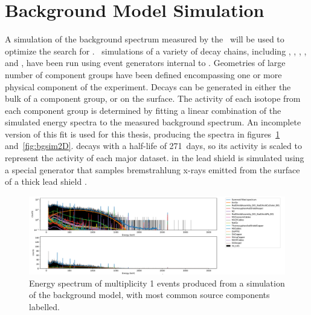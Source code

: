 \documentclass[/main.tex]{subfiles}
\begin{document}
\section{Background Model Simulation}
A simulation of the background spectrum measured by the \MJD\ will be used to optimize the search for \bbes.
\Mage\ simulations of a variety of decay chains, including , , , ,  and , have been run using event generators internal to \geant.
Geometries of large number of component groups have been defined encompassing one or more physical component of the experiment.
Decays can be generated in either the bulk of a component group, or on the surface.
The activity of each isotope from each component group is determined by fitting a linear combination of the simulated energy spectra to the measured background spectrum.
An incomplete version of this fit is used for this thesis, producing the spectra in figures~\ref{fig:bgsim1D} and~\ref{fig:bgsim2D}.
 decays with a half-life of 271~days, so its activity is scaled to represent the activity of each major dataset.
 in the lead shield is simulated using a special generator that samples bremstrahlung x-rays emitted from the surface of a thick lead shield \cite{VOJTYLA1996}.
\\
\begin{figure}
  \centering
  \includegraphics[width=1\linewidth]{BGsim1D}
  \caption[Simulation of multiplicty 1 events from the background model]{\label{fig:bgsim1D}
    Energy spectrum of multiplicity 1 events produced from a simulation of the background model, with most common source components labelled.
  }
\end{figure}
\end{document}

